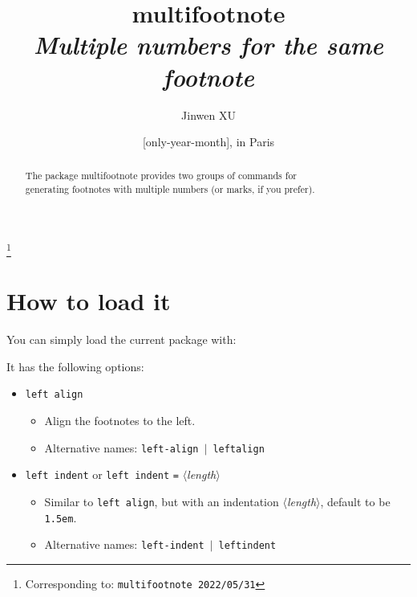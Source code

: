 \documentclass[classical]{einfart}
\newcommand{\meta}[1]{$\langle${\normalfont\itshape#1}$\rangle$}
\newcommand{\packageoption}[1]{\texttt{\textcolor{code-option}{#1}}}
\newcommand{\multifootnotepackage}{{\normalfont\textsf{multifootnote}}}
\begin{document}
\def\PackageVersion{2022/05/31}

\title{\multifootnotepackage{}\\\smallskip\itshape Multiple numbers for the same footnote}
\author{Jinwen XU}
\thanks{Corresponding to: \texttt{\multifootnotepackage{} \PackageVersion}}
\date{\TheDate{\PackageVersion}[only-year-month], in Paris}

\maketitle

\begin{abstract}
    \raggedleft
    The package \multifootnotepackage{} provides two groups of commands for \\generating footnotes with multiple numbers (or marks, if you prefer).
\end{abstract}


\vspace*{-.5\baselineskip}

\section{How to load it}

You can simply load the current package with:

\begin{code}
\usepackage[(*\meta{options}*)]{multifootnote}
\end{code}

\medskip
It has the following options:
\begin{itemize}[label=,leftmargin=1.25em,itemindent=-1.25em]
    \item \packageoption{left align}
        \begin{itemize}
            \item Align the footnotes to the left.
            \item Alternative names: \packageoption{left-align} \,$|$\, \packageoption{leftalign}
        \end{itemize}
    \item \packageoption{left indent} or \packageoption{left indent} \lstinline|=| \meta{length}
        \begin{itemize}
            \item Similar to \packageoption{left align}, but with an indentation \meta{length}, default to be \texttt{1.5em}.
            \item Alternative names: \packageoption{left-indent} \,$|$\, \packageoption{leftindent}
        \end{itemize}
\end{itemize}
\end{document}
